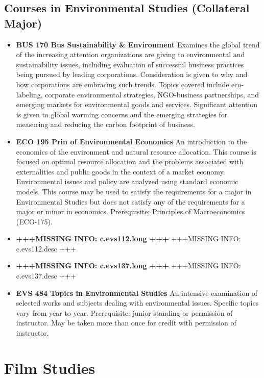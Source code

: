\documentclass[
  letterpaper,
]{scrbook}
\providecommand{\tightlist}{%
  \setlength{\itemsep}{0pt}\setlength{\parskip}{0pt}}
\begin{document}
\subsection{Courses in Environmental Studies (Collateral
Major)}\label{courses-in-environmental-studies-collateral-major}

\begin{itemize}
\tightlist
\item
  \textbf{BUS 170 Bus Sustainability \& Environment} Examines the global
  trend of the increasing attention organizations are giving to
  environmental and sustainability issues, including evaluation of
  successful business practices being pursued by leading corporations.
  Consideration is given to why and how corporations are embracing such
  trends. Topics covered include eco-labeling, corporate environmental
  strategies, NGO-business partnerships, and emerging markets for
  environmental goods and services. Significant attention is given to
  global warming concerns and the emerging strategies for measuring and
  reducing the carbon footprint of business.
\item
  \textbf{ECO 195 Prin of Environmental Economics} An introduction to
  the economics of the environment and natural resource allocation. This
  course is focused on optimal resource allocation and the problems
  associated with externalities and public goods in the context of a
  market economy. Environmental issues and policy are analyzed using
  standard economic models. This course may be used to satisfy the
  requirements for a major in Environmental Studies but does not satisfy
  any of the requirements for a major or minor in economics.
  Prerequisite: Principles of Macroeconomics (ECO-175).
\item
  \textbf{+++MISSING INFO: c.evs112.long +++} +++MISSING INFO:
  c.evs112.desc +++
\item
  \textbf{+++MISSING INFO: c.evs137.long +++} +++MISSING INFO:
  c.evs137.desc +++
\item
  \textbf{EVS 484 Topics in Environmental Studies} An intensive
  examination of selected works and subjects dealing with environmental
  issues. Specific topics vary from year to year. Prerequisite: junior
  standing or permission of instructor. May be taken more than once for
  credit with permission of instructor.
\end{itemize}

\section{Film Studies}\label{sec-film-studies}
\end{document}
